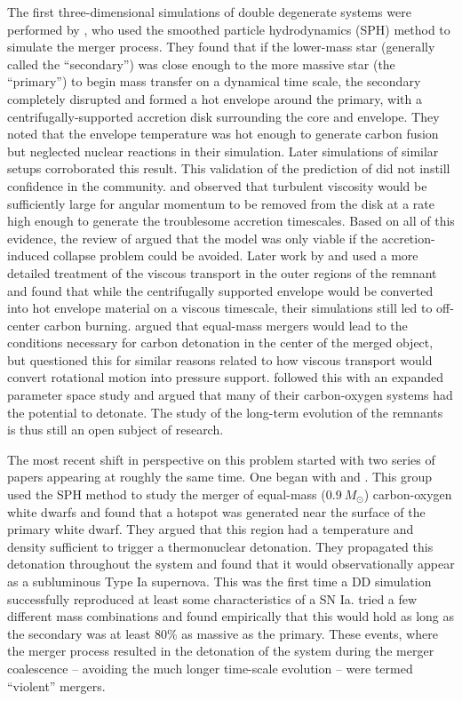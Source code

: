 \documentclass[12pt,preprint]{aastex}
\begin{document}
The first three-dimensional simulations of double degenerate systems were performed by \citet{benz:1990}, who used the smoothed particle hydrodynamics (SPH) method to simulate the merger process. They found that if the lower-mass star (generally called the ``secondary'') was close enough to the more massive star (the ``primary'') to begin mass transfer on a dynamical time scale, the secondary completely disrupted and formed a hot envelope around the primary, with a centrifugally-supported accretion disk surrounding the core and envelope. They noted that the envelope temperature was hot enough to generate carbon fusion but neglected nuclear reactions in their simulation. Later simulations of similar setups \citep{rasio_shapiro:1995,yoon:2007,loren-aguilar:2009,raskin:2012} corroborated this result. This validation of the prediction of \cite{tutukov_yungelson:1979} did not instill confidence in the community. \cite{mochkovitch_livio:1990} and \cite{livio:2000} observed that turbulent viscosity would be sufficiently large for angular momentum to be removed from the disk at a rate high enough to generate the troublesome accretion timescales. Based on all of this evidence, the review of \cite{hillebrandtniemeyer2000} argued that the model was only viable if the accretion-induced collapse problem could be avoided. Later work by \cite{shen:2012} and \cite{schwab:2012} used a more detailed treatment of the viscous transport in the outer regions of the remnant and found that while the centrifugally supported envelope would be converted into hot envelope material on a viscous timescale, their simulations still led to off-center carbon burning. \cite{vankerkwijk:2010} argued that equal-mass mergers would lead to the conditions necessary for carbon detonation in the center of the merged object, but \cite{shen:2012} questioned this for similar reasons related to how viscous transport would convert rotational motion into pressure support. \cite{zhu:2013} followed this with an expanded parameter space study and argued that many of their carbon-oxygen systems had the potential to detonate. The study of the long-term evolution of the remnants is thus still an open subject of research.

The most recent shift in perspective on this problem started with two series of papers appearing at roughly the same time. One began with \cite{pakmor:2010} and \cite{pakmor:2011}. This group used the SPH method to study the merger of equal-mass ($0.9\ M_\odot$) carbon-oxygen white dwarfs and found that a hotspot was generated near the surface of the primary white dwarf. They argued that this region had a temperature and density sufficient to trigger a thermonuclear detonation. They propagated this detonation throughout the system and found that it would observationally appear as a subluminous Type Ia supernova. This was the first time a DD simulation successfully reproduced at least some characteristics of a SN Ia. \cite{pakmor:2011} tried a few different mass combinations and found empirically that this would hold as long as the secondary was at least 80\% as massive as the primary. These events, where the merger process resulted in the detonation of the system during the merger coalescence -- avoiding the much longer time-scale evolution -- were termed ``violent'' mergers.
\end{document}
